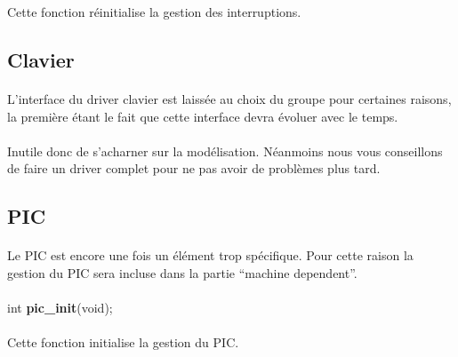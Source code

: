 \documentclass[10pt,a4wide]{article}
\begin{document}
Cette fonction r\'einitialise la gestion des interruptions.

\subsection{Clavier}

\paragraph{}

L'interface du driver clavier est laiss\'ee au choix du groupe pour certaines
raisons, la premi\`ere \'etant le fait que cette interface devra \'evoluer
avec le temps.

\paragraph{}

Inutile donc de s'acharner sur la mod\'elisation. N\'eanmoins nous vous
conseillons de faire un driver complet pour ne pas avoir de probl\`emes
plus tard.

\subsection{PIC}

\paragraph{}

Le PIC est encore une fois un \'el\'ement trop sp\'ecifique. Pour cette
raison la gestion du PIC sera incluse dans la partie ``machine dependent''.

\paragraph{}

\hspace{1.5cm}int \textbf{pic\_init}(void);

\paragraph{}

Cette fonction initialise la gestion du PIC.

\paragraph{}
\end{document}
